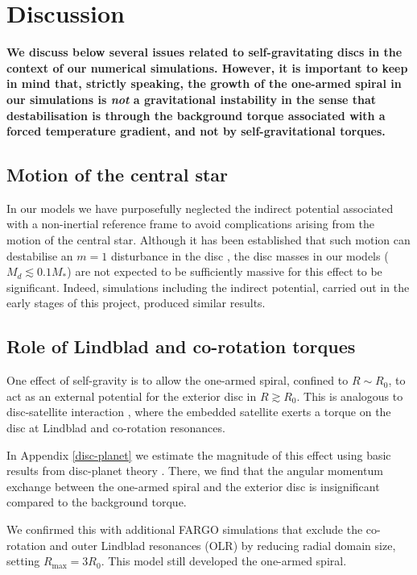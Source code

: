 
\section{Discussion}\label{discussions} 
{\bf
  We discuss below several issues related to self-gravitating
  discs in the context of our numerical simulations. However, it is
  important to keep in mind that, strictly speaking, 
  the growth of the one-armed spiral in our simulations is
  \emph{not} a gravitational instability in the sense that
  destabilisation is through the background torque associated with a
  forced temperature gradient, and not by self-gravitational torques.     
}

{\bf
  \subsection{Motion of the central star} 
  In our models we have purposefully neglected the indirect potential
  associated with a non-inertial reference frame to avoid
  complications arising from the motion of the central star.  
  Although it has been established that such motion can destabilise an
  $m=1$ disturbance in the disc \citep{adams89,shu90,michael10}, 
  the disc masses in our models ($M_d\lesssim 
  0.1 M_*$) are not expected to be sufficiently massive for this effect to be
  significant. Indeed, simulations including the
  indirect potential, carried out in the early stages of this project,
  produced similar results.    
  
  \subsection{Role of Lindblad and co-rotation torques}
  One effect of self-gravity is to allow the one-armed spiral,
  confined to $R\sim R_0$, to act as an external potential for the
  exterior disc in $R\gtrsim R_0$. This is 
  analogous to disc-satellite interaction 
  \citep{goldreich79}, where the embedded satellite exerts a torque on
  the disc at Lindblad and co-rotation resonances. 

  In Appendix \ref{disc-planet} we estimate the magnitude of this effect
  using basic results from disc-planet theory \citep[see, e.g.][and
  references therein]{papaloizou07}. There, we find that the angular
  momentum exchange between the one-armed spiral and the exterior disc
  is insignificant compared to the background torque.  
  
  We confirmed this with additional FARGO simulations that exclude the
  co-rotation and outer Lindblad resonances (OLR) by reducing radial domain
  size, setting $R_\mathrm{max} = 3 R_0$. This model still developed
  the one-armed spiral. 
}



